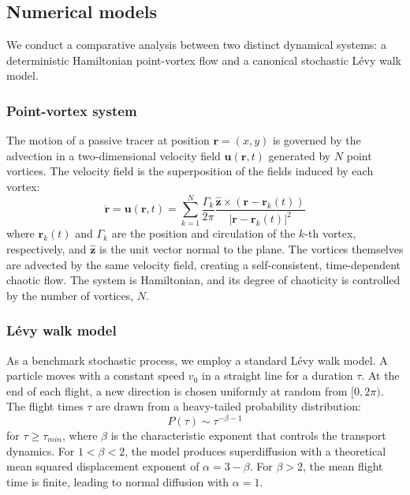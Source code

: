 \documentclass[]{article}
\begin{document}
\subsection{Numerical models}

We conduct a comparative analysis between two distinct dynamical systems: a deterministic Hamiltonian point-vortex flow and a canonical stochastic Lévy walk model.

\subsubsection{Point-vortex system}
The motion of a passive tracer at position $\mathbf{r} = (x, y)$ is governed by the advection in a two-dimensional velocity field $\mathbf{u}(\mathbf{r}, t)$ generated by $N$ point vortices. The velocity field is the superposition of the fields induced by each vortex:
\begin{equation}
\dot{\mathbf{r}} = \mathbf{u}(\mathbf{r}, t) = \sum_{k=1}^{N} \frac{\Gamma_k}{2\pi} \frac{\hat{\mathbf{z}} \times (\mathbf{r} - \mathbf{r}_k(t))}{|\mathbf{r} - \mathbf{r}_k(t)|^2}
\end{equation}
where $\mathbf{r}_k(t)$ and $\Gamma_k$ are the position and circulation of the $k$-th vortex, respectively, and $\hat{\mathbf{z}}$ is the unit vector normal to the plane. The vortices themselves are advected by the same velocity field, creating a self-consistent, time-dependent chaotic flow. The system is Hamiltonian, and its degree of chaoticity is controlled by the number of vortices, $N$.

\subsubsection{Lévy walk model}
As a benchmark stochastic process, we employ a standard Lévy walk model. A particle moves with a constant speed $v_0$ in a straight line for a duration $\tau$. At the end of each flight, a new direction is chosen uniformly at random from $[0, 2\pi)$. The flight times $\tau$ are drawn from a heavy-tailed probability distribution:
\begin{equation}
P(\tau) \sim \tau^{-\beta-1}
\end{equation}
for $\tau \ge \tau_{min}$, where $\beta$ is the characteristic exponent that controls the transport dynamics. For $1 < \beta < 2$, the model produces superdiffusion with a theoretical mean squared displacement exponent of $\alpha = 3 - \beta$. For $\beta > 2$, the mean flight time is finite, leading to normal diffusion with $\alpha=1$.
\end{document}
